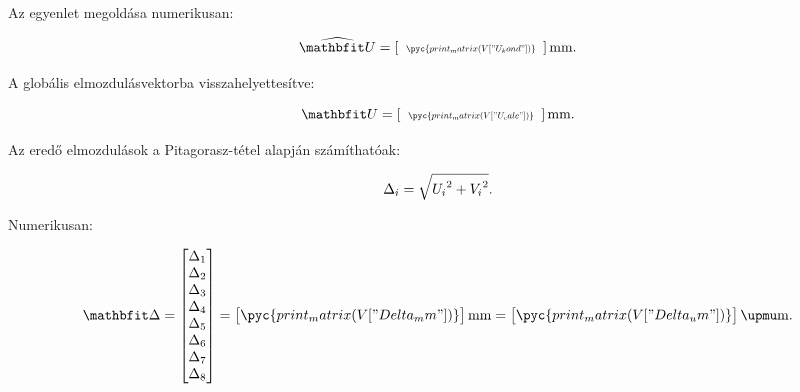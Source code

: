 Az egyenlet megoldása numerikusan:
\begin{myframe}
  \begin{equation}
    \siplaces{6}
    \widehat{\rvec U} = \left[
      \scalebox{.65}{
        $\begin{array}{c}
            \pyc{print_matrix(V["U_kond"])}
          \end{array}$
      }
      \right]
    \text{mm}
    \text.
  \end{equation}
\end{myframe}

A globális elmozdulásvektorba visszahelyettesítve:
\begin{myframe}
  \begin{equation}
    \siplaces{6}
    \rvec U = \left[
      \scalebox{.65}{
        $\begin{array}{c}
            \pyc{print_matrix(V["U_calc"])}
          \end{array}$
      }
      \right]
    \text{mm}
    \text.
  \end{equation}
\end{myframe}

Az eredő elmozdulások a Pitagorasz-tétel alapján számíthatóak:
\begin{myframe}
  \begin{equation}
    \Delta_i = \sqrt{{U_i}^2 + {V_i}^2}
    \text.
  \end{equation}
\end{myframe}

Numerikusan:
\begin{myframe}
  \begin{equation}
    \rvec{\Delta} = \begin{bmatrix}
      \Delta_1 \\
      \Delta_2 \\
      \Delta_3 \\
      \Delta_4 \\
      \Delta_5 \\
      \Delta_6 \\
      \Delta_7 \\
      \Delta_8 \\
    \end{bmatrix}
    =
    \siplaces{6}
    \begin{bmatrix}
      \pyc{print_matrix(V["Delta_mm"])}
    \end{bmatrix}
    \text{mm}
    =
    \siplaces{3}
    \begin{bmatrix}
      \pyc{print_matrix(V["Delta_um"])}
    \end{bmatrix}
    \upmu\text{m}
    \text.
  \end{equation}
\end{myframe}
